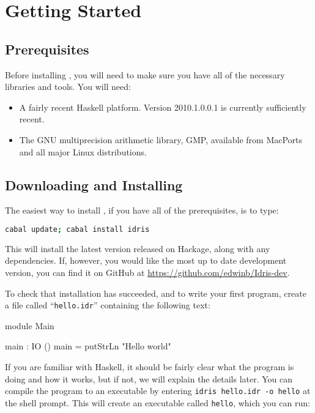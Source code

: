 \section{Getting Started}

\subsection{Prerequisites} 

Before installing \Idris{}, you will need to make sure you have all of the necessary
libraries and tools. You will need:

\begin{itemize}
\item A fairly recent Haskell platform. Version 2010.1.0.0.1 is currently
sufficiently recent.
\item The GNU multiprecision arithmetic library, GMP, available from MacPorts and
all major Linux distributions.
\end{itemize}

\subsection{Downloading and Installing}

The easiest way to install \Idris{}, if you have all of the prerequisites, is to type:

\begin{lstlisting}[language=bash]
cabal update; cabal install idris
\end{lstlisting}

\noindent
This will install the latest version released on Hackage, along with any dependencies. 
If, however, you would like the most up
to date development version, you can find it on GitHub at
\url{https://github.com/edwinb/Idris-dev}.

To check that installation has succeeded, and to write your first \Idris{}
program, create a file called ``\texttt{hello.idr}'' containing the following
text:

\begin{code}
module Main

main : IO ()
main = putStrLn "Hello world"
\end{code}

\noindent
If you are familiar with Haskell, it should be fairly clear what the program is doing
and how it works, but if not, we will explain the details later.
You can compile the program to an executable by entering \texttt{idris hello.idr -o hello}
at the shell prompt. This will create an executable called \texttt{hello}, which you can run:


